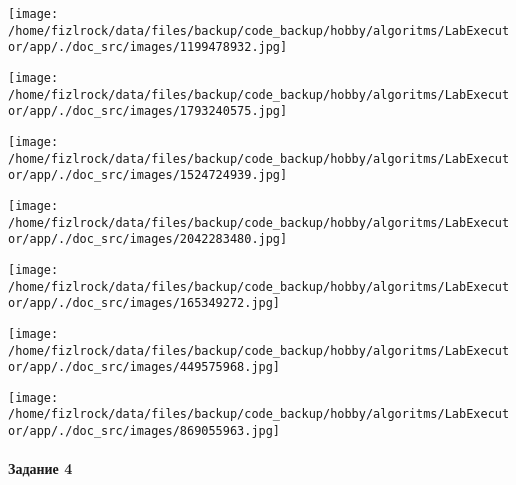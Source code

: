 \documentclass[a4paper, 12pt]{article}
\begin{document}
\texttt{[image: /home/fizlrock/data/files/backup/code\_backup/hobby/algoritms/LabExecutor/app/./doc\_src/images/1199478932.jpg]}

\texttt{[image: /home/fizlrock/data/files/backup/code\_backup/hobby/algoritms/LabExecutor/app/./doc\_src/images/1793240575.jpg]}

\texttt{[image: /home/fizlrock/data/files/backup/code\_backup/hobby/algoritms/LabExecutor/app/./doc\_src/images/1524724939.jpg]}

\texttt{[image: /home/fizlrock/data/files/backup/code\_backup/hobby/algoritms/LabExecutor/app/./doc\_src/images/2042283480.jpg]}

\texttt{[image: /home/fizlrock/data/files/backup/code\_backup/hobby/algoritms/LabExecutor/app/./doc\_src/images/165349272.jpg]}

\texttt{[image: /home/fizlrock/data/files/backup/code\_backup/hobby/algoritms/LabExecutor/app/./doc\_src/images/449575968.jpg]}

\texttt{[image: /home/fizlrock/data/files/backup/code\_backup/hobby/algoritms/LabExecutor/app/./doc\_src/images/869055963.jpg]}
\pagebreak
\paragraph{Задание 4}
\end{document}
